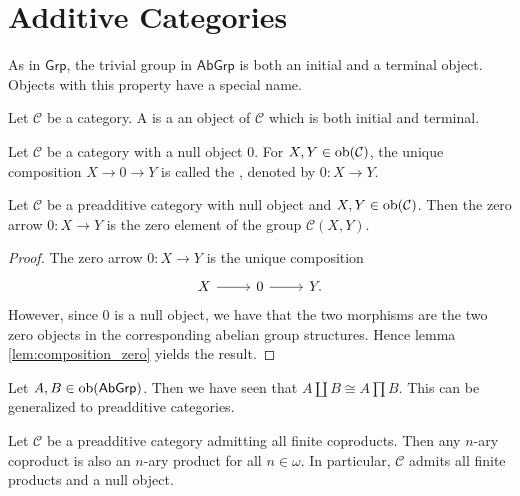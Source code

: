\section{Additive Categories}
As in $\mathsf{Grp}$, the trivial group in $\mathsf{AbGrp}$ is both an initial and a terminal object. Objects with this property have a special name.

\begin{definition}
	Let $\mathcal{C}$ be a category. A  is a an object of $\mathcal{C}$ which is both initial and terminal.
\end{definition}

\begin{definition}
	Let $\mathcal{C}$ be a category with a null object $0$. For $X,Y \in \operatorname{ob}(\mathcal{C})$, the unique composition $X \to 0 \to Y$ is called the , denoted by $0 : X \to Y$.
\end{definition}

\begin{lemma}
	\label{lem:zero_arrow}
	Let $\mathcal{C}$ be a preadditive category with null object and $X,Y \in \operatorname{ob}(\mathcal{C})$. Then the zero arrow $0 : X \to Y$ is the zero element of the group $\mathcal{C}(X,Y)$.
\end{lemma}

\begin{proof}
	The zero arrow $0 : X \to Y$ is the unique composition
	\begin{equation*}
		\begin{tikzcd}
			X \arrow[r] & 0 \arrow[r] & Y.
		\end{tikzcd}
	\end{equation*}
	However, since $0$ is a null object, we have that the two morphisms are the two zero objects in the corresponding abelian group structures. Hence lemma \ref{lem:composition_zero} yields the result.
\end{proof}

Let $A,B \in \operatorname{ob}(\mathsf{AbGrp})$. Then we have seen that $A \coprod B \cong A \prod B$. This can be generalized to preadditive categories.

\begin{proposition}
	\label{prop:products_and_coproducts_coincide}
	Let $\mathcal{C}$ be a preadditive category admitting all finite coproducts. Then any $n$-ary coproduct is also an $n$-ary product for all $n \in \omega$. In particular, $\mathcal{C}$ admits all finite products and a null object.
\end{proposition}

